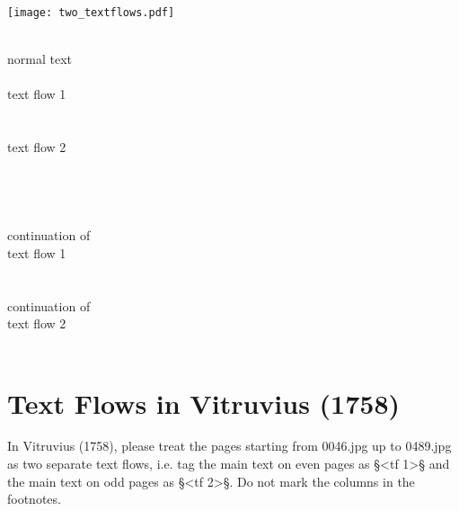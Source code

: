 \documentclass[fontsize=11pt, paper=a4, 
DIV15,
normalheadings,
parskip=half-, 
pointlessnumbers]{scrartcl}
\begin{document}
\begin{example}

\texttt{[image: two\_textflows.pdf]}

\begin{typeLatin}
 \\
normal text \\
 \\
text flow 1 \\
 \\
 \\
text flow 2 \\
 \\ \\
 \\
 \\
continuation of \\ 
text flow 1 \\
 \\
 \\
continuation of \\ 
text flow 2 \\
 \\
\end{typeLatin}
\end{example}


\section{Text Flows in Vitruvius (1758)}

\begin{mainrule}
In Vitruvius (1758), please treat the pages starting from 0046.jpg up to 0489.jpg as two separate text flows, i.e. tag the main text on even pages as §<tf 1>§ and the main text on odd pages as §<tf 2>§. Do not mark the columns in the footnotes.
\end{mainrule}
\end{document}
